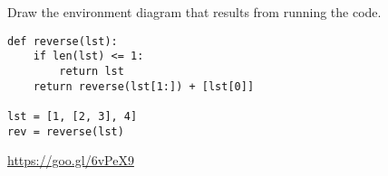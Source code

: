 \begin{blocksection}
\question Draw the environment diagram that results from running the code.

\begin{lstlisting}
def reverse(lst):
    if len(lst) <= 1:
        return lst
    return reverse(lst[1:]) + [lst[0]]

lst = [1, [2, 3], 4]
rev = reverse(lst)
\end{lstlisting}

\begin{solution}[2in]
\url{https://goo.gl/6vPeX9}
\end{solution}
\end{blocksection}
